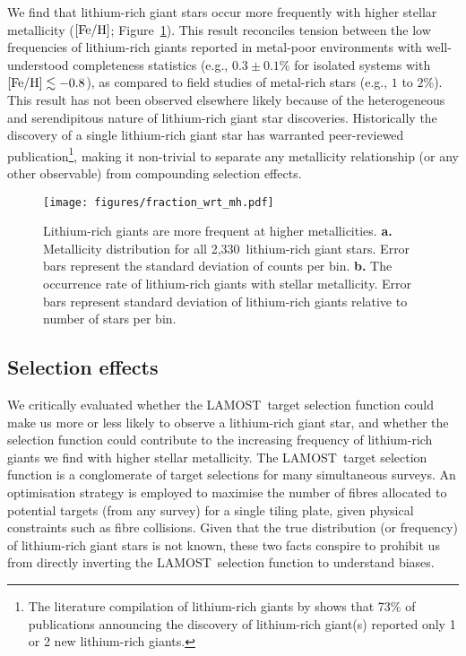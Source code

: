 \documentclass[twocolumn]{aastex62}
\newcommand{\SampleSize}{2,330}
\newcommand\lamost{LAMOST}
\begin{document}
We find that lithium-rich giant stars occur more frequently with higher stellar 
metallicity ($[{\rm Fe/H}]$; Figure~\ref{fig:mdf_frequency}). This result 
reconciles tension between the low frequencies of lithium-rich giants reported 
in metal-poor environments with well-understood completeness statistics \citep{Kirby_2016} 
(e.g., $0.3 \pm 0.1$\% for isolated systems with $[{\rm Fe/H}] \lesssim -0.8$), 
as compared to field studies of metal-rich stars \citep{Brown_1989} (e.g., $1$ to $2$\%). 
This result has not been observed elsewhere likely because of the heterogeneous and 
serendipitous nature of lithium-rich giant star discoveries. Historically the 
discovery of a single lithium-rich giant star has warranted peer-reviewed 
publication\footnote{The literature compilation of lithium-rich giants by \citet{Casey_2016} shows that 73\% of publications announcing the discovery of lithium-rich giant(s) reported only 1 or 2 new lithium-rich giants.}, making it non-trivial to separate any metallicity 
relationship (or any other observable) from compounding selection effects.

\begin{figure}
	\centering
	\texttt{[image: figures/fraction\_wrt\_mh.pdf]}
	\caption{
		Lithium-rich giants are more frequent at higher metallicities.
		\textbf{a.} Metallicity distribution for all
		\SampleSize\ lithium-rich giant stars. Error bars represent the standard deviation of counts per bin.
		\textbf{b.} The occurrence 
		rate of lithium-rich giants with stellar metallicity. Error bars represent standard deviation of lithium-rich giants relative to number of stars per bin.}
	\label{fig:mdf_frequency}
\end{figure} 

\subsection{Selection effects}

We critically evaluated whether the \lamost\ target selection function could 
make us more or less likely to observe a lithium-rich giant star, and whether
the selection function could contribute to the increasing frequency of lithium-rich
giants we find with higher stellar metallicity. The \lamost\ target selection function
is a conglomerate of target selections for many simultaneous surveys. An
optimisation strategy is employed to maximise the number of fibres allocated
to potential targets (from any survey) for a single tiling plate, given physical
constraints such as fibre collisions. Given that the true distribution (or 
frequency) of lithium-rich giant stars is not known, these two facts conspire 
to prohibit us from directly inverting the \lamost\ selection function to 
understand biases. 
\end{document}
